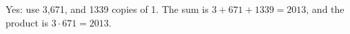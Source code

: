 Yes: use 3,671, and 1339 copies of 1. The sum is $3+671+1339=2013$, and the product is $3\cdot671=2013$.
